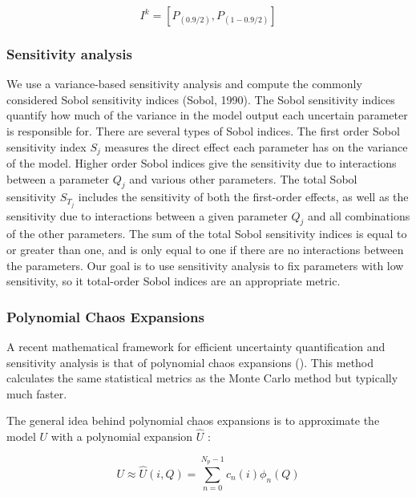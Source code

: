 \documentclass[utf8]{frontiersSCNS}
\begin{document}
\begin{equation}
I^k = [P_{(0.9/2)}, P_{(1-0.9/2)}]
\end{equation}


\subsubsection{Sensitivity analysis}

We use a variance-based sensitivity analysis and compute the commonly considered Sobol sensitivity indices
(Sobol, 1990). The Sobol sensitivity indices quantify how much of the variance in the model output each
uncertain parameter is responsible for. There are several types of Sobol indices. The first order Sobol
sensitivity index $S_j$ measures the direct effect each parameter has on the variance of the model. Higher order
Sobol indices give the sensitivity due to interactions between a parameter $Q_j$ and various other parameters.
The total Sobol sensitivity $S_{T_{j}}$ includes the sensitivity of both the first-order effects, as well as the
sensitivity due to interactions between a given parameter $Q_j$ and all combinations of the other
parameters. The sum of the total Sobol sensitivity indices is equal to or greater than one,
and is only equal to one if there are no interactions between the parameters. Our goal is to use sensitivity
analysis to fix parameters with low sensitivity, so it total-order Sobol indices are an appropriate metric.

\subsubsection{Polynomial Chaos Expansions}

A recent mathematical framework for efficient uncertainty quantification and sensitivity analysis is that of
polynomial chaos expansions (\cite{Xiu_2005}). This method calculates the same statistical metrics as the Monte
Carlo method but typically much faster.

The general idea behind polynomial chaos expansions is to approximate the model $U$ with a polynomial expansion
$\hat{U}$ : 

\begin{equation} U \approx \hat{U}(i, Q) = \sum_{n=0}^{N_p-1} c_n(i) \phi_n(Q) \end{equation}
\end{document}
